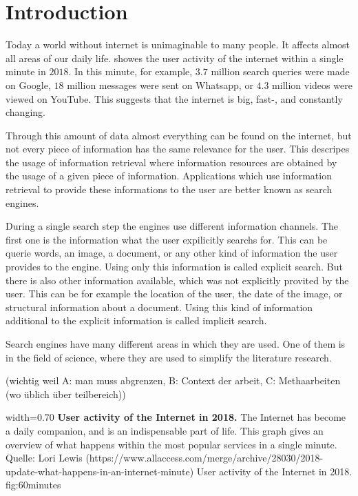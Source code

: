 \chapter{Introduction}
\label{cha:introduction}

Today a world without internet is unimaginable to many people. It affects almost all areas of our daily life.  showes the user activity of the internet within a single minute in $2018$. In this minute, for example, $3.7$ million search queries were made on Google, $18$ million messages were sent on Whatsapp, or $4.3$ million videos were viewed on YouTube. This suggests that the internet is big, fast-, and constantly changing.

Through this amount of data almost everything can be found on the internet, but not every piece of information has the same relevance for the user. This descripes the usage of information retrieval where information resources are obtained by the usage of a given piece of information. Applications which use information retrieval to provide these informations to the user are better known as search engines.

During a single search step the engines use different information channels. The first one is the information what the user expilicitly searchs for. This can be querie words, an image, a document, or any other kind of information the user provides to the engine. Using only this information is called explicit search. But there is also other information available, which was not explicitly provited by the user. This can be for example the location of the user, the date of the image, or structural information about a document. Using this kind of information additional to the explicit information is called implicit search.

Search engines have many different areas in which they are used. One of them is in the field of science, where they are used to simplify the literature research.


(wichtig weil A: man muss abgrenzen, B: Context der arbeit, C: Methaarbeiten (wo üblich über teilbereich))

      {width=0.70\textwidth}
      {\textbf{User activity of the Internet in 2018.} The Internet has become a daily companion, and is an indispensable part of life. This graph gives an overview of what happens within the most popular services in a single minute.  Quelle: Lori Lewis (https://www.allaccess.com/merge/archive/28030/2018-update-what-happens-in-an-internet-minute)}
      {User activity of the Internet in 2018.}
      {fig:60minutes}

